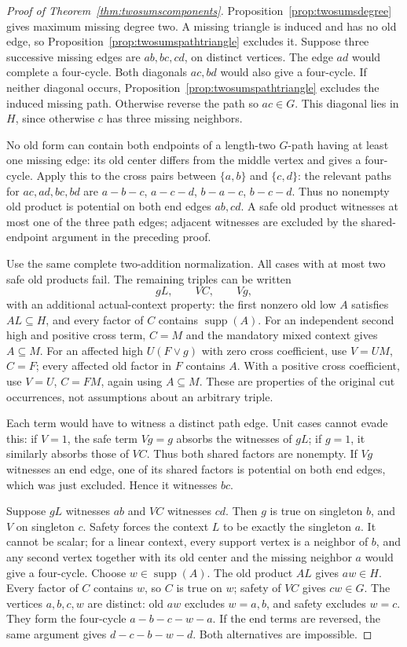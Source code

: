 \documentclass[11pt]{article}
\newcommand{\supp}{\operatorname{supp}}
\theoremstyle{definition}
\theoremstyle{remark}
\begin{document}
\begin{proof}[Proof of Theorem~\ref{thm:twosumscomponents}]
Proposition~\ref{prop:twosumsdegree} gives maximum missing degree two. A missing triangle is induced and has no old edge, so Proposition~\ref{prop:twosumspathtriangle} excludes it. Suppose three successive missing edges are $ab,bc,cd$, on distinct vertices. The edge $ad$ would complete a four-cycle. Both diagonals $ac,bd$ would also give a four-cycle. If neither diagonal occurs, Proposition~\ref{prop:twosumspathtriangle} excludes the induced missing path. Otherwise reverse the path so $ac\in G$. This diagonal lies in $H$, since otherwise $c$ has three missing neighbors.

No old form can contain both endpoints of a length-two $G$-path having at least one missing edge: its old center differs from the middle vertex and gives a four-cycle. Apply this to the cross pairs between $\{a,b\}$ and $\{c,d\}$: the relevant paths for $ac,ad,bc,bd$ are $a-b-c$, $a-c-d$, $b-a-c$, $b-c-d$. Thus no nonempty old product is potential on both end edges $ab,cd$. A safe old product witnesses at most one of the three path edges; adjacent witnesses are excluded by the shared-endpoint argument in the preceding proof.

Use the same complete two-addition normalization. All cases with at most two safe old products fail. The remaining triples can be written
\[
 gL,\qquad VC,\qquad Vg,
\]
with an additional actual-context property: the first nonzero old low $A$ satisfies $AL\subseteq H$, and every factor of $C$ contains $\supp(A)$. For an independent second high and positive cross term, $C=M$ and the mandatory mixed context gives $A\subseteq M$. For an affected high $U(F\vee g)$ with zero cross coefficient, use $V=UM$, $C=F$; every affected old factor in $F$ contains $A$. With a positive cross coefficient, use $V=U$, $C=FM$, again using $A\subseteq M$. These are properties of the original cut occurrences, not assumptions about an arbitrary triple.

Each term would have to witness a distinct path edge. Unit cases cannot evade this: if $V=1$, the safe term $Vg=g$ absorbs the witnesses of $gL$; if $g=1$, it similarly absorbs those of $VC$. Thus both shared factors are nonempty. If $Vg$ witnesses an end edge, one of its shared factors is potential on both end edges, which was just excluded. Hence it witnesses $bc$.

Suppose $gL$ witnesses $ab$ and $VC$ witnesses $cd$. Then $g$ is true on singleton $b$, and $V$ on singleton $c$. Safety forces the context $L$ to be exactly the singleton $a$. It cannot be scalar; for a linear context, every support vertex is a neighbor of $b$, and any second vertex together with its old center and the missing neighbor $a$ would give a four-cycle. Choose $w\in\supp(A)$. The old product $AL$ gives $aw\in H$. Every factor of $C$ contains $w$, so $C$ is true on $w$; safety of $VC$ gives $cw\in G$. The vertices $a,b,c,w$ are distinct: old $aw$ excludes $w=a,b$, and safety excludes $w=c$. They form the four-cycle $a-b-c-w-a$. If the end terms are reversed, the same argument gives $d-c-b-w-d$. Both alternatives are impossible.


\end{proof}
\end{document}
